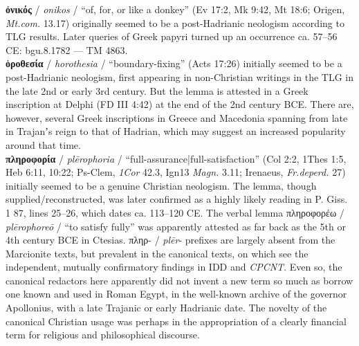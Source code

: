 \noindent{}\textbf{ὀνικός} / \textit{onikos} / “of, for, or like a donkey” (Ev 17:2, Mk 9:42, Mt 18:6; %
 Origen, \textit{Mt.com.} 13.17) originally seemed %
 to be a post-Hadrianic neologism according to TLG results. %
 Later queries of Greek papyri turned up an occurrence ca. 57--56 CE: %
 bgu.8.1782 — TM 4863. \\[1mm] %
 
 \noindent{}\textbf{ὁροθεσία} / \textit{horothesia} / “boundary-fixing” (Acts 17:26) %
 initially seemed to be a post-Hadrianic neologism, first %
 appearing in non-Christian writings in the TLG in the late 2nd or early 3rd century. %
 But the lemma is attested in a Greek inscription at Delphi (FD III 4:42) %
 at the end of the 2nd century BCE. %
 There are, however, several Greek inscriptions in Greece and Macedonia %
 spanning from late in Trajanʼs reign to that of Hadrian, %
 which may suggest an increased popularity around that time. \\[1mm] %

 \noindent{}\textbf{πληροφορία} / \textit{plērophoria} / “full-assurance|full-satisfaction” (Col 2:2, 1Thes 1:5, Heb 6:11, 10:22; %
 Ps-Clem, \textit{1Cor} 42.3, Ign13 \textit{Magn.} 3.11; Irenaeus, \textit{Fr.deperd.} 27) %
 initially seemed to be a genuine Christian neologism. %
 The lemma, though supplied/reconstructed, %
 was later confirmed as a highly likely reading in P. Giss. 1 87, lines 25--26, which dates ca. 113--120 CE. 
 The verbal lemma πληροφορέω / \textit{plērophoreō} / “to satisfy fully” %
 was apparently attested as far back as the 5th or 4th century BCE in Ctesias.
 πληρ- / \textit{plēr}- prefixes are largely absent from the Marcionite texts, but prevalent in the canonical texts, %
 on which see the independent, mutually confirmatory findings in IDD and \textit{CPCNT}. %
 Even so, the canonical redactors here apparently did not invent a new term so much as %
 borrow one known and used in Roman Egypt, in the well-known archive of the governor Apollonius, %
 with a late Trajanic or early Hadrianic date. %
 The novelty of the canonical Christian usage was perhaps in the %
 appropriation of a clearly financial term for religious and philosophical discourse. \\[1mm] %

